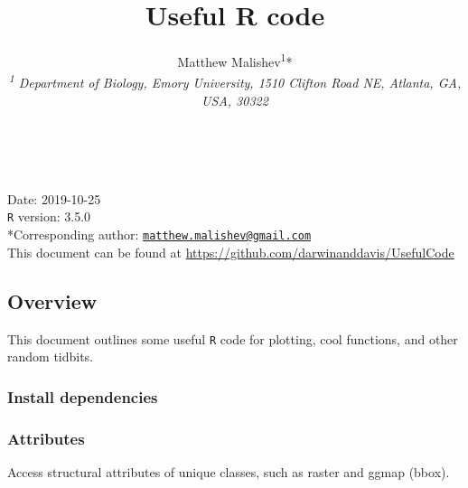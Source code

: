\documentclass[10,portrait]{article}
\title{Useful R code}
\author{Matthew
Malishev\textsuperscript{1}*\\[2\baselineskip]\emph{\textsuperscript{1}
Department of Biology, Emory University, 1510 Clifton Road NE, Atlanta,
GA, USA, 30322}}
\date{}
\newenvironment{Shaded}{\begin{snugshade}}{\end{snugshade}}
\newcommand{\KeywordTok}[1]{\textcolor[rgb]{0.13,0.29,0.53}{\textbf{#1}}}
\newcommand{\DataTypeTok}[1]{\textcolor[rgb]{0.13,0.29,0.53}{#1}}
\newcommand{\DecValTok}[1]{\textcolor[rgb]{0.00,0.00,0.81}{#1}}
\newcommand{\StringTok}[1]{\textcolor[rgb]{0.31,0.60,0.02}{#1}}
\newcommand{\CommentTok}[1]{\textcolor[rgb]{0.56,0.35,0.01}{\textit{#1}}}
\newcommand{\OperatorTok}[1]{\textcolor[rgb]{0.81,0.36,0.00}{\textbf{#1}}}
\newcommand{\NormalTok}[1]{#1}
\begin{document}
\maketitle

{
\hypersetup{linkcolor=black}
\setcounter{tocdepth}{4}
\tableofcontents
}
~

Date: 2019-10-25\\
\texttt{R} version: 3.5.0\\
*Corresponding author:
\href{mailto:matthew.malishev@gmail.com}{\nolinkurl{matthew.malishev@gmail.com}}\\
This document can be found at
\url{https://github.com/darwinanddavis/UsefulCode}

\newpage  

\subsection{Overview}\label{overview}

This document outlines some useful \texttt{R} code for plotting, cool
functions, and other random tidbits.

\subsubsection{Install dependencies}\label{install-dependencies}

\subsubsection{Attributes}\label{attributes}

Access structural attributes of unique classes, such as raster and ggmap
(bbox).

\begin{Shaded}
\end{Shaded}
\end{document}
